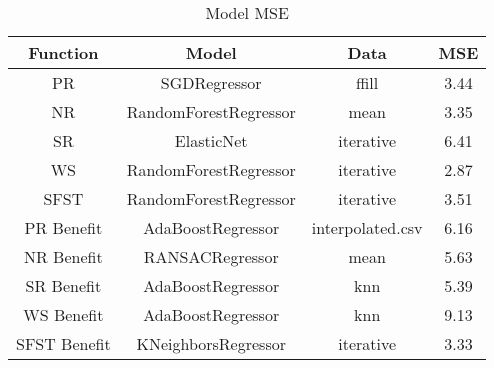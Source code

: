 \begin{table}
\centering
\begin{tabular}{|c|c|c|c|}
\hline
\textbf{Function} & \textbf{Model} & \textbf{Data} & \textbf{MSE} \\
\hline
PR & SGDRegressor & ffill & 3.44 \\
\hline
NR & RandomForestRegressor & mean & 3.35 \\
\hline
SR & ElasticNet & iterative & 6.41 \\
\hline
WS & RandomForestRegressor & iterative & 2.87 \\
\hline
SFST & RandomForestRegressor & iterative & 3.51 \\
\hline
PR Benefit & AdaBoostRegressor & interpolated.csv & 6.16 \\
\hline
NR Benefit & RANSACRegressor & mean & 5.63 \\
\hline
SR Benefit & AdaBoostRegressor & knn & 5.39 \\
\hline
WS Benefit & AdaBoostRegressor & knn & 9.13 \\
\hline
SFST Benefit & KNeighborsRegressor & iterative & 3.33 \\
\hline
\end{tabular}
\caption{Model MSE}
\label{tab_xtra:model_reg_specific_best}
\end{table}
